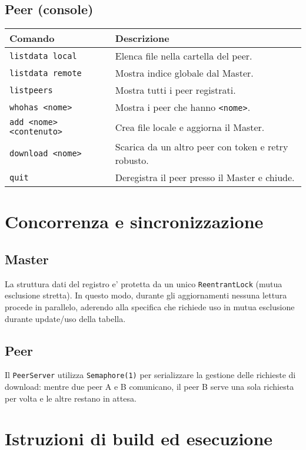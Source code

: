 \documentclass[a4paper,12pt]{article}
\begin{document}
\subsection*{Peer (console)}
\begin{tabularx}{\linewidth}{@{}lX@{}}
\toprule
\textbf{Comando} & \textbf{Descrizione} \\
\midrule
\texttt{listdata local} & Elenca file nella cartella del peer. \\
\texttt{listdata remote} & Mostra indice globale dal Master. \\
\texttt{listpeers} & Mostra tutti i peer registrati. \\
\texttt{whohas <nome>} & Mostra i peer che hanno \texttt{<nome>}. \\
\texttt{add <nome> <contenuto>} & Crea file locale e aggiorna il Master. \\
\texttt{download <nome>} & Scarica da un altro peer con token e retry robusto. \\
\texttt{quit} & Deregistra il peer presso il Master e chiude. \\
\bottomrule
\end{tabularx}

\section{Concorrenza e sincronizzazione}
\subsection{Master}
La struttura dati del registro e' protetta da un unico \texttt{ReentrantLock} (mutua esclusione stretta). In questo modo, durante gli aggiornamenti nessuna lettura procede in parallelo, aderendo alla specifica che richiede uso in mutua esclusione durante update/uso della tabella.

\subsection{Peer}
Il \texttt{PeerServer} utilizza \texttt{Semaphore(1)} per serializzare la gestione delle richieste di download: mentre due peer A e B comunicano, il peer B serve una sola richiesta per volta e le altre restano in attesa.

\section{Istruzioni di build ed esecuzione}
\end{document}
